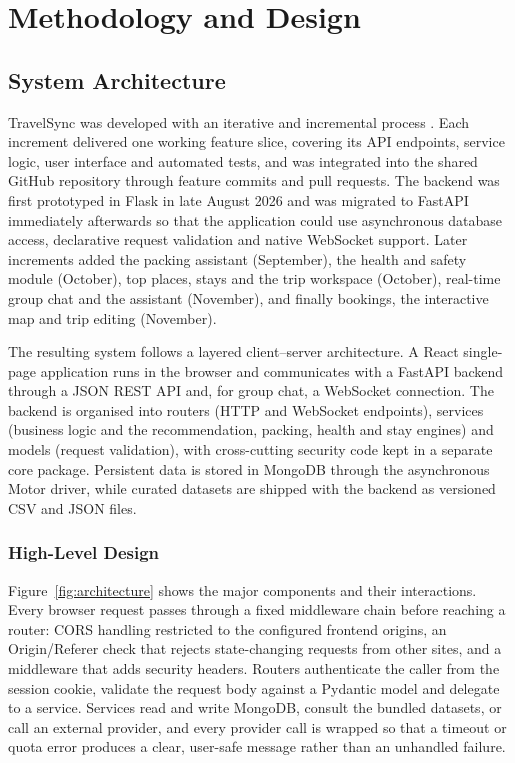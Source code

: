 
\chapter{Methodology and Design}
\label{chap:methodology}

\section{System Architecture}

TravelSync was developed with an iterative and incremental process
\cite{sommerville2016}. Each increment delivered one working feature slice,
covering its API endpoints, service logic, user interface and automated
tests, and was integrated into the shared GitHub repository through feature
commits and pull requests. The backend was first prototyped in Flask in late
August 2026 and was migrated to FastAPI \cite{fastapi} immediately afterwards
so that the application could use asynchronous database access, declarative
request validation and native WebSocket support. Later increments added the
packing assistant (September), the health and safety module (October), top
places, stays and the trip workspace (October), real-time group chat and the
assistant (November), and finally bookings, the interactive map and trip
editing (November).

The resulting system follows a layered client--server architecture. A React
single-page application runs in the browser and communicates with a FastAPI
backend through a JSON REST API and, for group chat, a WebSocket connection.
The backend is organised into routers (HTTP and WebSocket endpoints),
services (business logic and the recommendation, packing, health and stay
engines) and models (request validation), with cross-cutting security code
kept in a separate core package. Persistent data is stored in MongoDB through
the asynchronous Motor driver, while curated datasets are shipped with the
backend as versioned CSV and JSON files.

\subsection{High-Level Design}
\label{sec:high-level-design}

Figure~\ref{fig:architecture} shows the major components and their
interactions. Every browser request passes through a fixed middleware chain
before reaching a router: CORS handling restricted to the configured
frontend origins, an Origin/Referer check that rejects state-changing
requests from other sites, and a middleware that adds security headers.
Routers authenticate the caller from the session cookie, validate the request
body against a Pydantic model and delegate to a service. Services read and
write MongoDB, consult the bundled datasets, or call an external provider, and
every provider call is wrapped so that a timeout or quota error produces a
clear, user-safe message rather than an unhandled failure.

